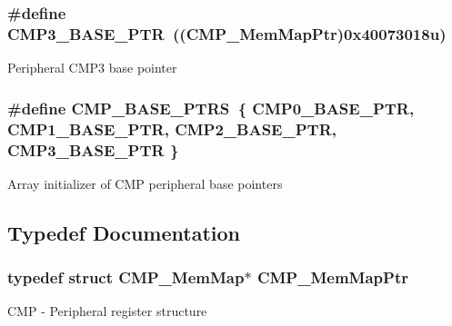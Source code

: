 \subsubsection[{C\+M\+P3\+\_\+\+B\+A\+S\+E\+\_\+\+P\+T\+R}]{\setlength{\rightskip}{0pt plus 5cm}\#define C\+M\+P3\+\_\+\+B\+A\+S\+E\+\_\+\+P\+T\+R~(({\bf C\+M\+P\+\_\+\+Mem\+Map\+Ptr})0x40073018u)}\label{group___c_m_p___peripheral_ga793306a1014f5112aa61f346fe3bb2c0}
Peripheral C\+M\+P3 base pointer \hypertarget{group___c_m_p___peripheral_gacc69654296499d45b2060956a3c8e97f}{}
\subsubsection[{C\+M\+P\+\_\+\+B\+A\+S\+E\+\_\+\+P\+T\+R\+S}]{\setlength{\rightskip}{0pt plus 5cm}\#define C\+M\+P\+\_\+\+B\+A\+S\+E\+\_\+\+P\+T\+R\+S~\{ {\bf C\+M\+P0\+\_\+\+B\+A\+S\+E\+\_\+\+P\+T\+R}, {\bf C\+M\+P1\+\_\+\+B\+A\+S\+E\+\_\+\+P\+T\+R}, {\bf C\+M\+P2\+\_\+\+B\+A\+S\+E\+\_\+\+P\+T\+R}, {\bf C\+M\+P3\+\_\+\+B\+A\+S\+E\+\_\+\+P\+T\+R} \}}\label{group___c_m_p___peripheral_gacc69654296499d45b2060956a3c8e97f}
Array initializer of C\+M\+P peripheral base pointers 

\subsection{Typedef Documentation}
\hypertarget{group___c_m_p___peripheral_ga6f5d370df3839e41b771c2d0b89cbb83}{}
\subsubsection[{C\+M\+P\+\_\+\+Mem\+Map\+Ptr}]{\setlength{\rightskip}{0pt plus 5cm}typedef struct {\bf C\+M\+P\+\_\+\+Mem\+Map}$\ast$ {\bf C\+M\+P\+\_\+\+Mem\+Map\+Ptr}}\label{group___c_m_p___peripheral_ga6f5d370df3839e41b771c2d0b89cbb83}
C\+M\+P -\/ Peripheral register structure 